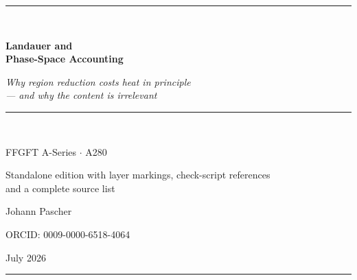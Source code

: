 \documentclass[11pt,a4paper]{article}
\begin{document}
\begin{titlepage}
\centering
\vspace*{2.2cm}
{\color{rulecol}\rule{0.5\textwidth}{0.6pt}}\\[1.4cm]
{\color{accent}\Huge\bfseries Landauer and\\[0.3em] Phase-Space Accounting\par}
\vspace{1.0cm}
{\large\itshape Why region reduction costs heat in principle\\ --- and why the content is irrelevant\par}
\vspace{0.6cm}
{\color{accent2}\rule{0.28\textwidth}{0.4pt}}\\[1.0cm]
{\large FFGFT A-Series $\cdot$ A280\par}
\vspace{0.5cm}
{\normalsize Standalone edition with layer markings, check-script references\\ and a complete source list\par}
\vfill
{\large Johann Pascher\par}
\vspace{0.3cm}
{\footnotesize ORCID: 0009-0000-6518-4064\par}
\vspace{0.2cm}
{\footnotesize July 2026\par}
\vspace{1.4cm}
{\color{rulecol}\rule{0.5\textwidth}{0.6pt}}
\vspace*{1.5cm}
\end{titlepage}

\tableofcontents
\thispagestyle{fancy}
\clearpage
\end{document}
